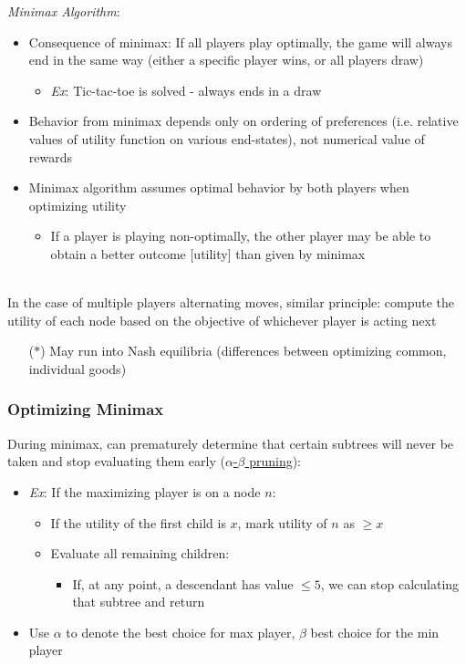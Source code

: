 \documentclass[12pt]{extarticle}
\theoremstyle{definition}
\theoremstyle{remark}
\newcommand{\pstart}[0]{\noindent}
\newcommand{\newp}[0]{~\\ \pstart}
\begin{document}
\vspace{8pt}\pstart
\textit{Minimax Algorithm}: \begin{itemize}
    \item Consequence of minimax: If all players play optimally, the game will always end in the same way (either a specific player wins, or all players draw) \begin{itemize}
        \item \textit{Ex}: Tic-tac-toe is solved - always ends in a draw
    \end{itemize}
    \item Behavior from minimax depends only on ordering of preferences (i.e. relative values of utility function on various end-states), not numerical value of rewards
    \item Minimax algorithm assumes optimal behavior by both players when optimizing utility \begin{itemize}
        \item If a player is playing non-optimally, the other player may be able to obtain a better outcome [utility] than given by minimax
    \end{itemize}
\end{itemize}

\newp
In the case of multiple players alternating moves, similar principle: compute the utility of each node based on the objective of whichever player is acting next \begin{itemize}
    \item[($\ast$)] May run into Nash equilibria (differences between optimizing common, individual goods)
\end{itemize}

\subsubsection{Optimizing Minimax}
\pstart
During minimax, can prematurely determine that certain subtrees will never be taken and stop evaluating them early (\ul{$\alpha$-$\beta$ pruning}): \begin{itemize}
    \item \textit{Ex}: If the maximizing player is on a node $n$: \begin{itemize}
        \item If the utility of the first child is $x$, mark utility of $n$ as $\geq x$
        \item Evaluate all remaining children: \begin{itemize}
            
            \item If, at any point, a descendant has value $\leq 5$, we can stop calculating that subtree and return
        \end{itemize}
    \end{itemize}
    \item Use $\alpha$ to denote the best choice for max player, $\beta$ best choice for the min player
\end{itemize}
\end{document}
